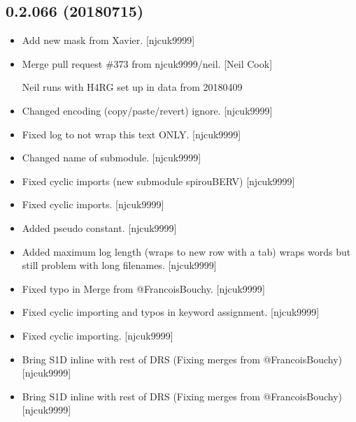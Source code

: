\documentclass[a4paper,10pt,english]{report}
\begin{document}
\subsection{0.2.066 (2018\sphinxhyphen{}07\sphinxhyphen{}15)}
\label{\detokenize{misc/changelog:id412}}\begin{itemize}
\item {} 
Add new mask from Xavier. {[}njcuk9999{]}

\item {} 
Merge pull request \#373 from njcuk9999/neil. {[}Neil Cook{]}

Neil \sphinxhyphen{} runs with H4RG set up in data from 2018\sphinxhyphen{}04\sphinxhyphen{}09

\item {} 
Changed encoding (copy/paste/revert) \textendash{} ignore. {[}njcuk9999{]}

\item {} 
Fixed log to not wrap this text \sphinxhyphen{} ONLY. {[}njcuk9999{]}

\item {} 
Changed name of sub\sphinxhyphen{}module. {[}njcuk9999{]}

\item {} 
Fixed cyclic imports (new sub\sphinxhyphen{}module \sphinxhyphen{} spirouBERV) {[}njcuk9999{]}

\item {} 
Fixed cyclic imports. {[}njcuk9999{]}

\item {} 
Added  pseudo constant. {[}njcuk9999{]}

\item {} 
Added maximum log length (wraps to new row with a tab) wraps words but
still problem with long filenames. {[}njcuk9999{]}

\item {} 
Fixed typo in Merge from @FrancoisBouchy. {[}njcuk9999{]}

\item {} 
Fixed cyclic importing and typos in keyword assignment. {[}njcuk9999{]}

\item {} 
Fixed cyclic importing. {[}njcuk9999{]}

\item {} 
Bring S1D  in\sphinxhyphen{}line with rest of DRS (Fixing merges from
@FrancoisBouchy) {[}njcuk9999{]}

\item {} 
Bring S1D  in\sphinxhyphen{}line with rest of DRS (Fixing merges from
@FrancoisBouchy) {[}njcuk9999{]}


\end{itemize}
\end{document}
